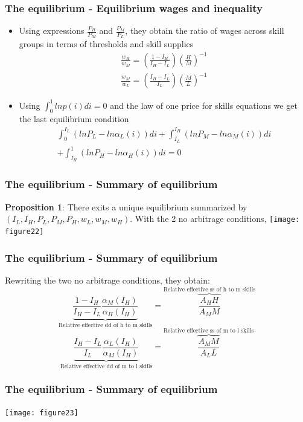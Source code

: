\documentclass[mathserif]{beamer}
\begin{document}
\begin{frame}
\frametitle{The equilibrium - Equilibrium wages and inequality}
\begin{itemize}
\item Using expressions $\frac{P_H}{P_M}$ and $\frac{P_M}{P_L}$, they obtain the ratio of wages across skill groups in terms of thresholds and skill supplies
\begin{multline*}
\frac{w_H}{w_M}=(\frac{1-I_H}{I_H-I_L})(\frac{H}{M})^{-1}
\\ \frac{w_M}{w_L}=(\frac{I_H-I_L}{I_L})(\frac{M}{L})^{-1}
\end{multline*}
\item Using $\int_0^1lnp(i)di=0$ and the law of one price for skills equations we get the last equilibrium condition
\begin{multline*}
\int_0^{I_L}(lnP_L-ln\alpha_L(i))di+\int_{I_L}^{I_H}(lnP_M-ln\alpha_M(i))di \\ +\int_{I_H}^1(lnP_H-ln\alpha_H(i))di=0
\end{multline*}
\end{itemize}
\end{frame}
\begin{frame}
\frametitle{The equilibrium - Summary of equilibrium}
\textbf{Proposition 1}: There exits a unique equilibrium summarized by $(I_L,I_H,P_L,P_M,P_H,w_L,w_M,w_H)$. With the 2 no arbitrage conditions,
\texttt{[image: figure22]}
\end{frame}
\begin{frame}
\frametitle{The equilibrium - Summary of equilibrium}
Rewriting the two no arbitrage conditions, they obtain:
\begin{equation*}
\underbrace{\frac{1-I_H}{I_H-I_L}\frac{\alpha_M(I_H)}{\alpha_H(I_H)}}_{\text{Relative effective dd of h to m skills}}=\overbrace{\frac{A_HH}{A_MM}}^{\text{Relative effective ss of h to m skills}}
\end{equation*}
\begin{equation*}
\underbrace{\frac{I_H-I_L}{I_L}\frac{\alpha_L(I_H)}{\alpha_M(I_H)}}_{\text{Relative effective dd of m to l skills}}=\overbrace{\frac{A_MM}{A_LL}}^{\text{Relative effective ss of m to l skills}}
\end{equation*}
\end{frame}
\begin{frame}
\frametitle{The equilibrium - Summary of equilibrium}
\texttt{[image: figure23]}
\end{frame}
\end{document}
